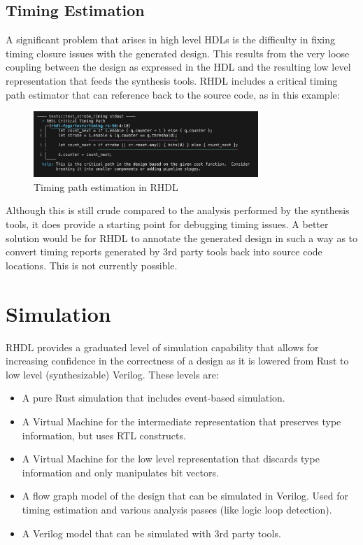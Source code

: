 \documentclass[sigplan,screen,sigconf]{acmart}
\begin{document}
\subsection{Timing Estimation}
A significant problem that arises in high level HDLs is the difficulty in fixing timing closure issues with the generated design.  This results from the very loose coupling between the design as expressed in the HDL and the resulting low level representation that feeds the synthesis tools.  RHDL includes a critical timing path estimator that can reference back to the source code, as in this example:

\begin{figure}[h]
  \centering
  \includegraphics[width=8.5cm]{timing.png}
  \caption{Timing path estimation in RHDL}
\end{figure}

Although this is still crude compared to the analysis performed by the synthesis tools, it does provide a starting point for debugging timing issues.  A better solution would be for RHDL to annotate the generated design in such a way as to convert timing reports generated by 3rd party tools back into source code locations.  This is not currently possible.

\section{Simulation}

RHDL provides a graduated level of simulation capability that allows for increasing confidence in the correctness of a design as it is lowered from Rust to low level (synthesizable) Verilog.  These levels are:
\begin{itemize}
\item A pure Rust simulation that includes event-based simulation.
\item A Virtual Machine for the intermediate representation that preserves type information, but uses RTL constructs.
\item A Virtual Machine for the low level representation that discards type information and only manipulates bit vectors.
\item A flow graph model of the design that can be simulated in Verilog.  Used for timing estimation and various analysis passes (like logic loop detection).
\item A Verilog model that can be simulated with 3rd party tools.
\end{itemize}
\end{document}
